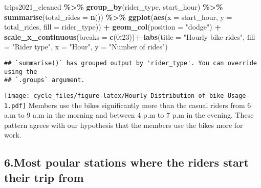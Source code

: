 \documentclass[
]{article}
\newenvironment{Shaded}{\begin{snugshade}}{\end{snugshade}}
\newcommand{\AttributeTok}[1]{\textcolor[rgb]{0.13,0.29,0.53}{#1}}
\newcommand{\DecValTok}[1]{\textcolor[rgb]{0.00,0.00,0.81}{#1}}
\newcommand{\FunctionTok}[1]{\textcolor[rgb]{0.13,0.29,0.53}{\textbf{#1}}}
\newcommand{\NormalTok}[1]{#1}
\newcommand{\SpecialCharTok}[1]{\textcolor[rgb]{0.81,0.36,0.00}{\textbf{#1}}}
\newcommand{\StringTok}[1]{\textcolor[rgb]{0.31,0.60,0.02}{#1}}
\begin{document}
\begin{Shaded}
\begin{Highlighting}[]
\NormalTok{trips2021\_cleaned }\SpecialCharTok{\%\textgreater{}\%} 
  \FunctionTok{group\_by}\NormalTok{(rider\_type, start\_hour) }\SpecialCharTok{\%\textgreater{}\%} 
  \FunctionTok{summarise}\NormalTok{(}\AttributeTok{total\_rides =} \FunctionTok{n}\NormalTok{()) }\SpecialCharTok{\%\textgreater{}\%} 
  \FunctionTok{ggplot}\NormalTok{(}\FunctionTok{aes}\NormalTok{(}\AttributeTok{x =}\NormalTok{ start\_hour, }\AttributeTok{y =}\NormalTok{ total\_rides, }\AttributeTok{fill =}\NormalTok{ rider\_type)) }\SpecialCharTok{+}
  \FunctionTok{geom\_col}\NormalTok{(}\AttributeTok{position =} \StringTok{"dodge"}\NormalTok{) }\SpecialCharTok{+}
    \FunctionTok{scale\_x\_continuous}\NormalTok{(}\AttributeTok{breaks =} \FunctionTok{c}\NormalTok{(}\DecValTok{0}\SpecialCharTok{:}\DecValTok{23}\NormalTok{))}\SpecialCharTok{+}
  \FunctionTok{labs}\NormalTok{(}\AttributeTok{title =} \StringTok{"Hourly bike rides"}\NormalTok{, }
       \AttributeTok{fill =} \StringTok{"Rider type"}\NormalTok{, }\AttributeTok{x =} \StringTok{"Hour"}\NormalTok{,}
       \AttributeTok{y =} \StringTok{"Number of rides"}\NormalTok{)}
\end{Highlighting}
\end{Shaded}

\begin{verbatim}
## `summarise()` has grouped output by 'rider_type'. You can override using the
## `.groups` argument.
\end{verbatim}

\texttt{[image: cycle\_files/figure-latex/Hourly Distribution of bike Usage-1.pdf]}
Members use the bikes significantly more than the casual riders from 6
a.m to 9 a.m in the morning and between 4 p.m to 7 p.m in the evening.
These pattern agrees with our hypothesis that the members use the bikes
more for work.

\hypertarget{most-poular-stations-where-the-riders-start-their-trip-from}{%
\subsection{6.Most poular stations where the riders start their trip
from}\label{most-poular-stations-where-the-riders-start-their-trip-from}}
\end{document}
